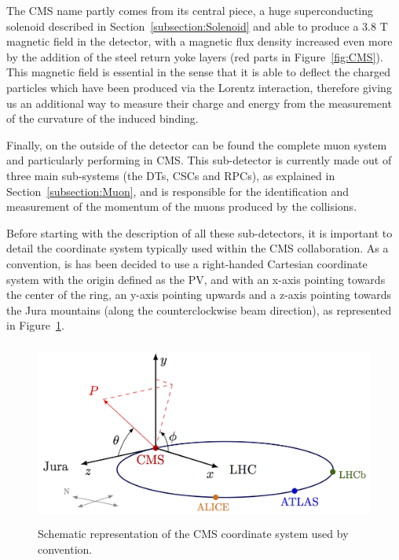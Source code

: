 \documentclass[a4paper, 10pt, openright]{report}
\begin{document}
The \ac{CMS} name partly comes from its central piece, a huge superconducting solenoid described in Section~\ref{subsection:Solenoid} and able to produce a 3.8 T magnetic field in the detector, with a magnetic flux density increased even more by the addition of the steel return yoke layers (red parts in Figure~\ref{fig:CMS}). This magnetic field is essential in the sense that it is able to deflect the charged particles which have been produced via the Lorentz interaction, therefore giving us an additional way to measure their charge and energy from the measurement of the curvature of the induced binding.

Finally, on the outside of the detector can be found the complete muon system and particularly performing in \ac{CMS}. This sub-detector is currently made out of three main sub-systems (the \acp{DT}, \acp{CSC} and \acp{RPC}), as explained in Section~\ref{subsection:Muon}, and is responsible for the identification and measurement of the momentum of the muons produced by the collisions.

Before starting with the description of all these sub-detectors, it is important to detail the coordinate system typically used within the \ac{CMS} collaboration. As a convention, is has been decided to use a right-handed Cartesian coordinate system with the origin defined as the \acf{PV}, and with an x-axis pointing towards the center of the ring, an y-axis pointing upwards and a z-axis pointing towards the Jura mountains (along the counterclockwise beam direction), as represented in Figure~\ref{fig:CMSAxis}. 

\begin{figure}[htbp]
\begin{center}
\includegraphics[width=12cm, height=6cm]{figs/CMSAxis.png}
\caption{Schematic representation of the \ac{CMS} coordinate system used by convention.}
\label{fig:CMSAxis}
\end{center}
\end{figure}
\end{document}

